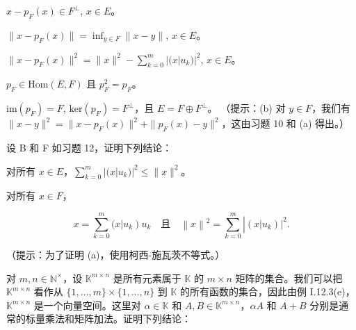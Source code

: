 \begin{exercises}
\begin{items}
$ x - p_F(x) \in F^\perp $,  $ x \in E $。

\item

$ \|x - p_F(x)\| = \inf_{y \in F} \|x - y\| $,  $ x \in E $。

\item

$ \|x - p_F(x)\|^2 = \|x\|^2 - \sum_{k=0}^{m} |(x | u_k)|^2 $,  $ x \in E $。

\item

$ p_F \in \mathrm{Hom}(E, F) $ 且 $ p_F^2 = p_F $。

\item

$ \mathrm{im}(p_F) = F $,  $ \mathrm{ker}(p_F) = F^\perp $，且 $ E = F \oplus F^\perp $。
（提示：(b) 对 $y \in F$，我们有 $\|x - y\|^2 = \|x - p_F(x)\|^2 + \|p_F(x) - y\|^2$，这由习题 10 和 (a) 得出。）

\end{items}

\item[13.]

设 B 和 F 如习题 12，证明下列结论：

\begin{items}
\item

对所有 $ x \in E $，$ \sum_{k=0}^{m} |(x | u_{k})|^{2} \leq \|x\|^{2} $。

\item

对所有 $ x \in F $，

\[
x=\sum_{k=0}^{m}(x\left|u_{k}\right)u_{k}\quad\text{且}\quad\left\|x\right\|^{2}=\sum_{k=0}^{m}\left|\left(x\left|u_{k}\right)\right|^{2}\right..
\]

（提示：为了证明 (a)，使用柯西-施瓦茨不等式。）

\end{items}

\item[14.]

对 $m, n \in \mathbb{N}^\times$，设 $\mathbb{K}^{m \times n}$ 是所有元素属于 $\mathbb{K}$ 的 $m \times n$ 矩阵的集合。我们可以把 $\mathbb{K}^{m \times n}$ 看作从 $\{1, \ldots, m\} \times \{1, \ldots, n\}$ 到 $\mathbb{K}$ 的所有函数的集合，因此由例 I.12.3(e)，$\mathbb{K}^{m \times n}$ 是一个向量空间。这里对 $\alpha \in \mathbb{K}$ 和 $A, B \in \mathbb{K}^{m \times n}$，$\alpha A$ 和 $A + B$ 分别是通常的标量乘法和矩阵加法。证明下列结论：


\end{exercises}
